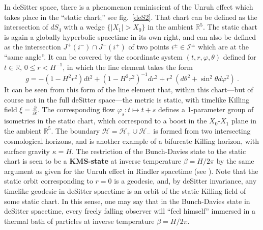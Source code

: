 \documentclass[12pt]{article}
\newcommand{\RR}{\mathbb{R}}
\theoremstyle{plain}
\theoremstyle{definition}
\def\ben{\begin{equation}}
\def\een{\end{equation}}
\begin{document}
In deSitter space, there is a phenomenon reminiscient of the Unruh effect which takes place in the ``static chart;'' see fig.~\ref{deS2}. That chart can be defined as the
intersection of $dS_4$ with a wedge $\{|X_1| > X_0\}$ in the ambient $\RR^5$.
The static chart is again a globally hyperbolic spacetime in its own right, and can also be
defined as the intersection $J^+(i^-) \cap J^-(i^+)$ of two points $i^\pm \in \mathscr{I}^\pm$
which are at the ``same angle''. It can be covered by the coordinate
system $(t, r, \varphi, \theta)$ defined for $t \in \RR, \, 0\le r < H^{-1}$, in which
the line element takes the form
\ben\label{static}
g = - (1-H^2r^2) dt^2 + (1-H^2 r^2)^{-1} dr^2 + r^2 \ (d\theta^2 + \sin^2
\theta d\varphi^2) \ .
\een
It can be seen from this form of the line element that,
within this chart---but of course not
in the full deSitter space---the
metric is static, with timelike Killing field $\xi =
\frac{\partial}{\partial t}$. The corresponding flow
$\varphi_s: t \mapsto t+s$ defines a 1-parameter group of isometries
in the static chart, which correspond to a boost in the $X_0$-$X_1$ plane in the ambient
$\RR^5$. The boundary $\mathcal{H} = \mathcal{H}_+ \cup \mathcal{H}_-$ is formed from two intersecting
cosmological horizons, and is another example of a bifurcate Killing horizon,
with surface gravity $\kappa = H$. The restriction of the Bunch-Davies state to the static chart
is seen to be a {\bf KMS-state} at inverse temperature $\beta = H/2\pi$ by the same
argument as given for the Unruh effect in Rindler spacetime (see \cite{kaywald}). Note that the static orbit corresponding to $r=0$ is a geodesic,
and, by deSitter invariance, any timelike geodesic in deSitter spacetime is an orbit of the static Killing field of some static chart. In this sense, one may say that in the Bunch-Davies state in deSitter spacetime, every freely falling observer will ``feel himself'' immersed in a thermal bath of particles at inverse temperature $\beta = H/2\pi$.
\end{document}
